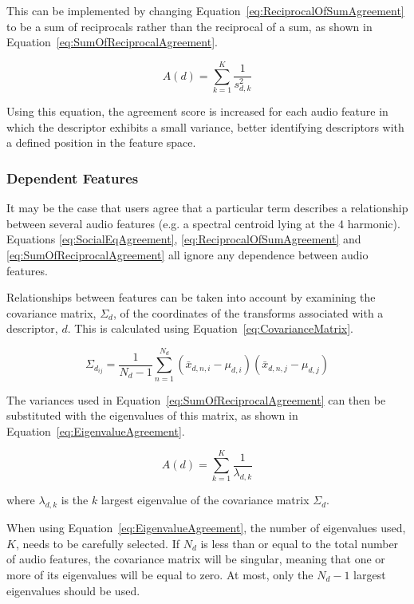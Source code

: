 			This can be implemented by changing Equation~\ref{eq:ReciprocalOfSumAgreement} to be a sum of
			reciprocals rather than the reciprocal of a sum, as shown in
			Equation~\ref{eq:SumOfReciprocalAgreement}.

			\begin{equation}
				A(d) = \sum_{k = 1}^{K} \frac{1}{s_{d,k}^{2}}
				\label{eq:SumOfReciprocalAgreement}
			\end{equation}

			Using this equation, the agreement score is increased for each audio feature in which the
			descriptor exhibits a small variance, better identifying descriptors with a defined position in
			the feature space.

		\subsubsection*{Dependent Features}
			It may be the case that users agree that a particular term describes a relationship between several
			audio features (e.g. a spectral centroid lying at the 4 harmonic). Equations
			\ref{eq:SocialEqAgreement}, \ref{eq:ReciprocalOfSumAgreement} and \ref{eq:SumOfReciprocalAgreement}
			all ignore any dependence between audio features.

			Relationships between features can be taken into account by examining the covariance matrix,
			$\Sigma_{d}$, of the coordinates of the transforms associated with a descriptor, $d$. This is
			calculated using Equation~\ref{eq:CovarianceMatrix}.

			\begin{equation}
				{\Sigma_{d_{ij}}} = \frac{1}{N_{d} - 1} \sum_{n = 1}^{N_{d}} 
						     (\bar{x}_{d,n,i} - \mu_{d,i})(\bar{x}_{d,n,j} - \mu_{d,j})
				\label{eq:CovarianceMatrix}
			\end{equation}
			
			The variances used in Equation~\ref{eq:SumOfReciprocalAgreement} can then be substituted with the
			eigenvalues of this matrix, as shown in Equation~\ref{eq:EigenvalueAgreement}.

			\begin{equation}
				A(d) = \sum_{k = 1}^{K} \frac{1}{\lambda_{d,k}}
				\label{eq:EigenvalueAgreement}
			\end{equation}
			
			where $\lambda_{d, k}$ is the $k$ largest eigenvalue of the covariance matrix
			$\Sigma_{d}$.

			When using Equation~\ref{eq:EigenvalueAgreement}, the number of eigenvalues used, $K$, needs to be
			carefully selected. If $N_{d}$ is less than or equal to the total number of audio features, the
			covariance matrix will be singular, meaning that one or more of its eigenvalues will be equal to
			zero. At most, only the $N_{d} - 1$ largest eigenvalues should be used.
			
